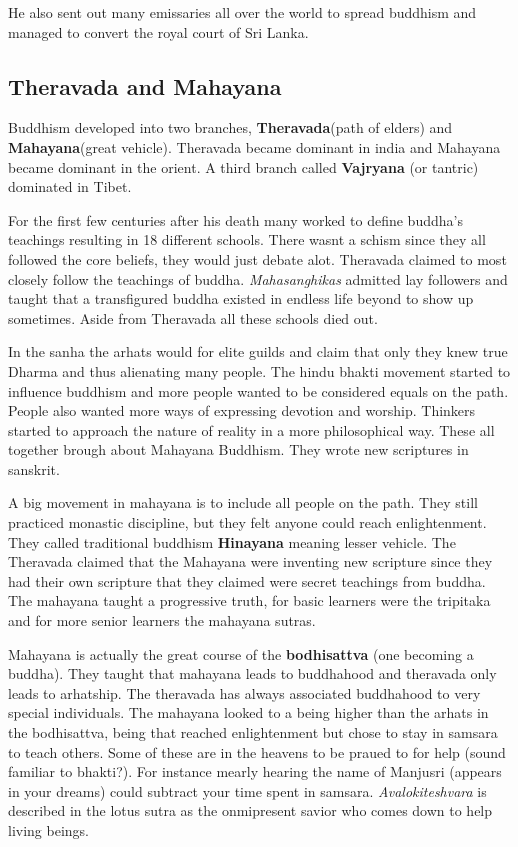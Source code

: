\documentclass{article}
\begin{document}
He also sent out many emissaries all over the world to spread buddhism and managed to convert the royal court of Sri Lanka.

\subsection*{Theravada and Mahayana}
\label{sub:theravada_and_mahayana}
Buddhism developed into two branches, \textbf{Theravada}(path of elders) and \textbf{Mahayana}(great vehicle). Theravada became dominant in india and Mahayana became dominant in the orient. A third branch called \textbf{Vajryana} (or tantric) dominated in Tibet.

For the first few centuries after his death many worked to define buddha's teachings resulting in 18 different schools. There wasnt a schism since they all followed the core beliefs, they would just debate alot. Theravada claimed to most closely follow the teachings of buddha. \emph{Mahasanghikas} admitted lay followers and taught that a transfigured buddha existed in endless life beyond to show up sometimes. Aside from Theravada all these schools died out.

In the sanha the arhats would for elite guilds and claim that only they knew true Dharma and thus alienating many people. The hindu bhakti movement started to influence buddhism and more people wanted to be considered equals on the path. People also wanted more ways of expressing devotion and worship. Thinkers started to approach the nature of reality in a more philosophical way. These all together brough about Mahayana Buddhism. They wrote new scriptures in sanskrit.

A big movement in mahayana is to include all people on the path. They still practiced monastic discipline, but they felt anyone could reach enlightenment. They called traditional buddhism \textbf{Hinayana} meaning lesser vehicle. The Theravada claimed that the Mahayana were inventing new scripture since they had their own scripture that they claimed were secret teachings from buddha. The mahayana taught a progressive truth, for basic learners were the tripitaka and for more senior learners the mahayana sutras.

Mahayana is actually the great course of the \textbf{bodhisattva} (one becoming a buddha). They taught that mahayana leads to buddhahood and theravada only leads to arhatship. The theravada has always associated buddhahood to very special individuals. The mahayana looked to a being higher than the arhats in the bodhisattva, being that reached enlightenment but chose to stay in samsara to teach others. Some of these are in the heavens to be praued to for help (sound familiar to bhakti?). For instance mearly hearing the name of Manjusri (appears in your dreams) could subtract your time spent in samsara. \emph{Avalokiteshvara} is described in the lotus sutra as the onmipresent savior who comes down to help living beings.
\end{document}
